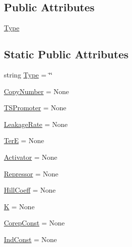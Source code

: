 \subsection*{Public Attributes}
\begin{DoxyCompactItemize}
\item 
\hyperlink{classweb_1_1_simulate___class_1_1_d_n_a___simulate_aa234468d2d8f7d04de55e93cb1ab0680}{Type}
\end{DoxyCompactItemize}
\subsection*{Static Public Attributes}
\begin{DoxyCompactItemize}
\item 
string \hyperlink{classweb_1_1_simulate___class_1_1_d_n_a___simulate_a85da64f8805311e83467d99e2b4553a1}{Type} = \char`\"{}\char`\"{}
\item 
\hyperlink{classweb_1_1_simulate___class_1_1_d_n_a___simulate_a399330e85a7f32291f717b9eb846d080}{Copy\-Number} = None
\item 
\hyperlink{classweb_1_1_simulate___class_1_1_d_n_a___simulate_aea102d7a236466b4204e777bcbcfb1af}{T\-S\-Promoter} = None
\item 
\hyperlink{classweb_1_1_simulate___class_1_1_d_n_a___simulate_abc27d2561f40165607efd2b894fc18ef}{Leakage\-Rate} = None
\item 
\hyperlink{classweb_1_1_simulate___class_1_1_d_n_a___simulate_af4973b509128336acfee906693d6af4b}{Ter\-E} = None
\item 
\hyperlink{classweb_1_1_simulate___class_1_1_d_n_a___simulate_ae298041c1b536e5ab369dff6cd3bac76}{Activator} = None
\item 
\hyperlink{classweb_1_1_simulate___class_1_1_d_n_a___simulate_a6fc6961ca56a8c2f63f6289001092aa8}{Repressor} = None
\item 
\hyperlink{classweb_1_1_simulate___class_1_1_d_n_a___simulate_afe473f23d1ec1f5e576297bfa99b8d55}{Hill\-Coeff} = None
\item 
\hyperlink{classweb_1_1_simulate___class_1_1_d_n_a___simulate_ab41cef07d4729f53b81042b06b637fdf}{K} = None
\item 
\hyperlink{classweb_1_1_simulate___class_1_1_d_n_a___simulate_a4c01a78dc773cffe777a928a3ad8abcf}{Corep\-Const} = None
\item 
\hyperlink{classweb_1_1_simulate___class_1_1_d_n_a___simulate_a555c52a90c570dda2ccd7a0ec7eb00e2}{Ind\-Const} = None
\end{DoxyCompactItemize}


